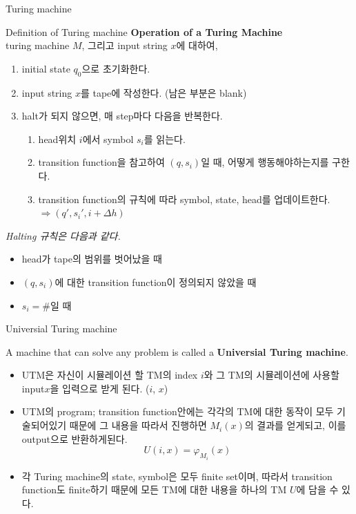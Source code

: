 \documentclass[9pt]{beamer}
\begin{document}
\begin{section}{Turing machine}
        \begin{frame}{Definition of Turing machine}
            \textbf{Operation of a Turing Machine}
            \\turing machine $M$, 그리고 input string $x$에 대하여,
            \begin{enumerate}
                \item initial state $q_0$으로 초기화한다.
                \item input string $x$를 tape에 작성한다. (남은 부분은 blank)
                \item halt가 되지 않으면, 매 step마다 다음을 반복한다.
                \begin{enumerate}
                    \item head위치 $i$에서 symbol $s_i$를 읽는다.
                    \item transition function을 참고하여 $(q, s_i)$일 때, 어떻게 행동해야하는지를 구한다.
                    \item transition function의 규칙에 따라 symbol, state, head를 업데이트한다. \\ $ \Rightarrow (q', s_i', i+\Delta h)$
                \end{enumerate}
            \end{enumerate}

            \vspace{0.8cm}
            \textit{Halting 규칙은 다음과 같다.}
            \begin{itemize}
                \item head가 tape의 범위를 벗어났을 때
                \item $(q, s_i)$에 대한 transition function이 정의되지 않았을 때
                \item $s_i = \#$일 때
            \end{itemize}
        \end{frame}

        \begin{frame}{Universial Turing machine}
            \begin{definition}
                A machine that can solve any problem is called a \textbf{Universial Turing machine}.
            \end{definition}
            \begin{itemize}
                \item UTM은 자신이 시뮬레이션 할 TM의 index $i$와 그 TM의 시뮬레이션에 사용할 input$x$을 입력으로 받게 된다. ($i$, $x$)
                \item UTM의 program; transition function안에는 각각의 TM에 대한 동작이 모두 기술되어있기 때문에 그 내용을 따라서 진행하면 $M_i(x)$의 결과를 얻게되고, 이를 output으로 반환하게된다.
                $$ U(i, x) = \varphi_{M_i}(x)$$
                \item 각 Turing machine의 state, symbol은 모두 \alert{finite set}이며, 따라서 transition function도 finite하기 때문에 모든 TM에 대한 내용을 하나의 TM $U$에 담을 수 있다.
            \end{itemize}
        \end{frame}


\end{section}
\end{document}

